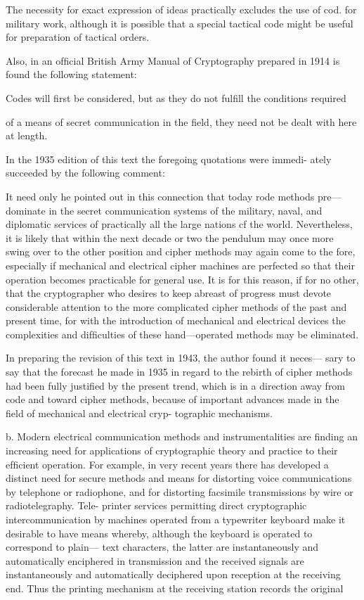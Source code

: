 The necessity for exact expression of ideas practically excludes the use of cod.
for military work, although it is possible that a special tactical code might be
useful for preparation of tactical orders.

Also, in an ofﬁcial British Army Manual of Cryptography prepared in
1914 is found the following statement:

Codes will ﬁrst be considered, but as they do not fulﬁll the conditions required

of a means of secret communication in the ﬁeld, they need not be dealt with here
at length.

In the 1935 edition of this text the foregoing quotations were immedi-
ately succeeded by the following comment:

It need only he pointed out in this connection that today rode methods pre—
dominate in the secret communication systems of the military, naval, and diplomatic
services of practically all the large nations cf the world. Nevertheless, it is likely
that within the next decade or two the pendulum may once more swing over to the
other position and cipher methods may again come to the fore, especially if
mechanical and electrical cipher machines are perfected so that their operation
becomes practicable for general use. It is for this reason, if for no other, that the
cryptographer who desires to keep abreast of progress must devote considerable
attention to the more complicated cipher methods of the past and present time,
for with the introduction of mechanical and electrical devices the complexities and
difﬁculties of these hand—operated methods may be eliminated.

In preparing the revision of this text in 1943, the author found it neces—
sary to say that the forecast he made in 1935 in regard to the rebirth of
cipher methods had been fully justiﬁed by the present trend, which is in
a direction away from code and toward cipher methods, because of
important advances made in the ﬁeld of mechanical and electrical cryp-
tographic mechanisms.

b. Modern electrical communication methods and instrumentalities are
ﬁnding an increasing need for applications of cryptographic theory and
practice to their efﬁcient operation. For example, in very recent years
there has developed a distinct need for secure methods and means for
distorting voice communications by telephone or radiophone, and
for distorting facsimile transmissions by wire or radiotelegraphy. Tele-
printer services permitting direct cryptographic intercommunication by
machines operated from a typewriter keyboard make it desirable to have
means whereby, although the keyboard is operated to correspond to plain—
text characters, the latter are instantaneously and automatically
enciphered in transmission and the received signals are instantaneously
and automatically deciphered upon reception at the receiving end. Thus
the printing mechanism at the receiving station records the original


